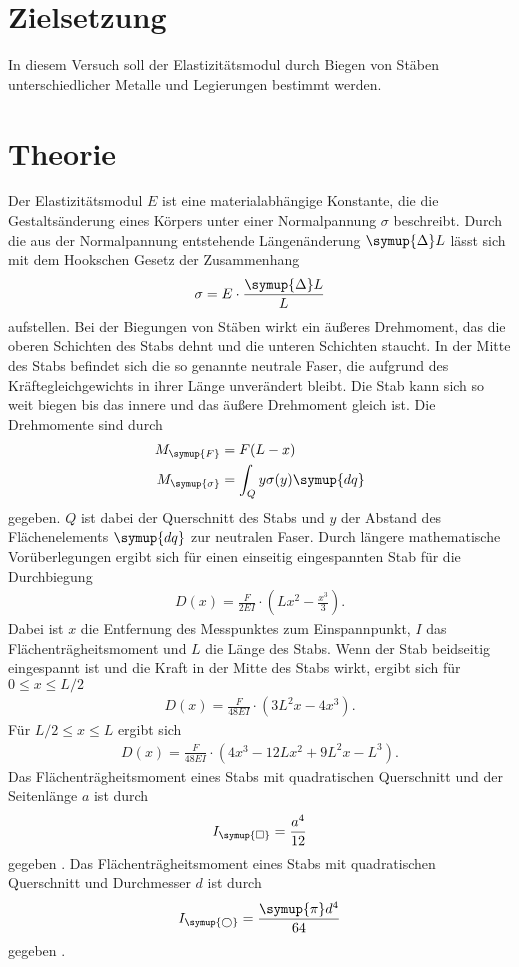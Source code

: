 \section{Zielsetzung}
\label{sec:Zielsetzung}
In diesem Versuch soll der Elastizitätsmodul durch Biegen von Stäben unterschiedlicher Metalle und Legierungen bestimmt werden.

\section{Theorie}
\label{sec:Theorie}
Der Elastizitätsmodul $E$ ist eine materialabhängige Konstante, die die Gestaltsänderung eines Körpers unter einer Normalpannung $\sigma$ beschreibt.
Durch die aus der Normalpannung entstehende Längenänderung $\symup{\Delta} L$ lässt sich mit dem Hookschen Gesetz der Zusammenhang
\begin{align}
    \label{eqn:Elasitizitaetsmodul}
    \sigma = E \cdot \frac{\symup{\Delta} L}{L}
\end{align}
aufstellen. Bei der Biegungen von Stäben wirkt ein äußeres Drehmoment, das die oberen Schichten des Stabs dehnt und die unteren Schichten staucht.
In der Mitte des Stabs befindet sich die so genannte neutrale Faser, die aufgrund des Kräftegleichgewichts in ihrer Länge unverändert bleibt.
Die Stab kann sich so weit biegen bis das innere und das äußere Drehmoment gleich ist. Die Drehmomente sind durch
\begin{align*}
    M_{\symup{F}} &= F(L-x)\\
    M_{\symup{\sigma}} &= \int_{Q} y\sigma(y)\symup{dq}
\end{align*}
gegeben. $Q$ ist dabei der Querschnitt des Stabs und $y$ der Abstand des Flächenelements $\symup{dq}$ zur neutralen Faser.
Durch längere mathematische Vorüberlegungen ergibt sich für einen einseitig eingespannten Stab für die Durchbiegung
\begin{align}
    \label{eqn:Durchbiegung}
    D(x) = \frac{F}{2EI} \cdot\left(Lx^2 - \frac{x^3}{3}\right).
\end{align}
Dabei ist $x$ die Entfernung des Messpunktes zum Einspannpunkt, $I$ das Flächenträgheitsmoment und $L$ die Länge des Stabs.
Wenn der Stab beidseitig eingespannt ist und die Kraft in der Mitte des Stabs wirkt, ergibt sich für $0 \leq x \leq L/2$
\begin{align}
    \label{eqn:DurchbiegungL/2}
    D(x) = \frac{F}{48EI}\cdot \left(3L^2 x - 4x^3\right).
\end{align}
Für $L/2 \leq x \leq L$ ergibt sich
\begin{align}
    \label{eqn:DurchbiegungL}
    D(x) = \frac{F}{48EI}\cdot \left(4x^3 -12Lx^2 +9L^2 x - L^3\right).
\end{align}
Das Flächenträgheitsmoment eines Stabs mit quadratischen Querschnitt und der Seitenlänge $a$ ist durch
\begin{align}
    I_{\symup{\square}} = \frac{a^4}{12}
\end{align}
gegeben \cite{flaechentreagheitsmomente}. Das Flächenträgheitsmoment eines Stabs mit quadratischen Querschnitt und Durchmesser $d$ ist durch
\begin{align}
    I_{\symup{\bigcirc}} = \frac{\symup{\pi}d^4}{64}
\end{align}
gegeben \cite{flaechentreagheitsmomente}.
